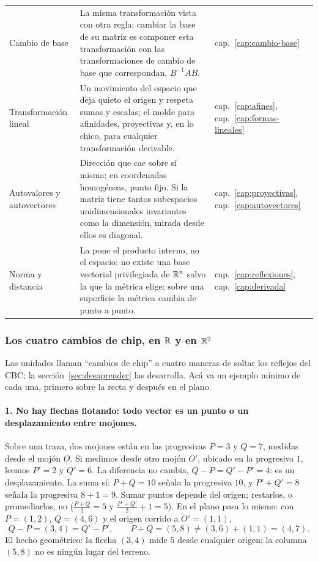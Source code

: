 {\begin{tabularx}{\textwidth}{>{\raggedright\arraybackslash}p{30mm} Y >{\raggedright\arraybackslash}p{17mm}}
Cambio de base &
La misma transformación vista con otra regla: cambiar la base de su matriz es componer
esta transformación con las transformaciones de cambio de base que correspondan,
\(B^{-1}AB\). &
cap.~\ref{cap:cambio-base}\\
Transformación lineal &
Un movimiento del espacio que deja quieto el origen y respeta sumas y escalas; el molde
para afinidades, proyectivas y, en lo chico, para cualquier transformación derivable. &
cap.~\ref{cap:afines}, cap.~\ref{cap:formas-lineales}\\
Autovalores y autovectores &
Dirección que cae sobre sí misma; en coordenadas homogéneas, punto fijo. Si la matriz tiene
tantos subespacios unidimensionales invariantes como la dimensión,
mirada desde ellos es diagonal. &
cap.~\ref{cap:proyectivas}, cap.~\ref{cap:autovectores}\\
Norma y distancia &
La pone el producto interno, no el espacio: no existe una base vectorial privilegiada de
\(\mathbb{R}^n\) salvo la que la métrica elige; sobre una superficie la
métrica cambia de punto a punto. &
cap.~\ref{cap:reflexiones}, cap.~\ref{cap:derivada}\\
\bottomrule
\end{tabularx}
}

\subsubsection*{Los cuatro cambios de chip, en \(\mathbb{R}\) y en \(\mathbb{R}^2\)}

Las unidades llaman \enquote{cambios de chip} a cuatro maneras de soltar los reflejos del
CBC; la sección~\ref{sec:desaprender} las desarrolla. Acá va un ejemplo mínimo de cada una,
primero sobre la recta y después en el plano.

\paragraph{1. No hay flechas flotando: todo vector es un punto o un desplazamiento entre
mojones.}
Sobre una traza, dos mojones están en las progresivas \(P=3\) y \(Q=7\), medidas desde el
mojón \(O\). Si medimos desde otro mojón \(O'\), ubicado en la progresiva \(1\), leemos
\(P'=2\) y \(Q'=6\). La diferencia no cambia, \(Q-P=Q'-P'=4\): es un desplazamiento. La suma
sí: \(P+Q=10\) señala la progresiva \(10\), y \(P'+Q'=8\) señala la progresiva \(8+1=9\).
Sumar puntos depende del origen; restarlos, o promediarlos, no
(\(\tfrac{P+Q}{2}=5\) y \(\tfrac{P'+Q'}{2}+1=5\)). En el plano pasa lo mismo: con
\(P=(1,2)\), \(Q=(4,6)\) y el origen corrido a \(O'=(1,1)\),
\[
  Q-P=(3,4)=Q'-P',\qquad P+Q=(5,8)\neq(3,6)+(1,1)=(4,7).
\]
El hecho geométrico: la flecha \((3,4)\) mide \(5\) desde cualquier origen; la columna
\((5,8)\) no es ningún lugar del terreno.

